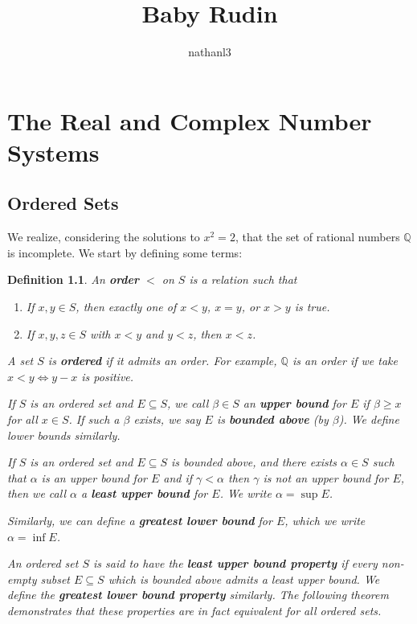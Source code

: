 \documentclass{scrbook}
\title{Baby Rudin}
\author{nathanl3}
\newcommand{\Q}{\mathbb{Q}}
\newtheorem{definition}{Definition}
\begin{document}
\maketitle

\tableofcontents

%

\chapter{The Real and Complex Number Systems}

\section{Ordered Sets}
We realize, considering the solutions to $x^2 = 2$, that the set of rational numbers $\Q$ is incomplete. We start by defining some terms:
\begin{definition}
An \textbf{order} $<$ on $S$ is a relation such that 
\begin{enumerate}
\item If $x, y \in S$, then exactly one of $x < y$, $x = y$, or $x > y$ is true.
\item If $x, y, z \in S$ with $x < y$ and $y < z$, then $x < z$. 
\end{enumerate}

A set $S$ is \textbf{ordered} if it admits an order. For example, $\Q$ is an order if we take $x < y \iff y - x$ is positive. 

If $S$ is an ordered set and $E \subseteq S$, we call $\beta \in S$ an \textbf{upper bound} for $E$ if $\beta \ge x$ for all $x \in S$. If such a $\beta$ exists, we say $E$ is \textbf{bounded above} (by $\beta$). We define lower bounds similarly. 

If $S$ is an ordered set and $E \subseteq S$ is bounded above, and there exists $\alpha \in S$ such that $\alpha$ is an upper bound for $E$ and if $\gamma < \alpha$ then $\gamma$ is not an upper bound for $E$, then we call $\alpha$ a \textbf{least upper bound} for $E$. We write $\alpha = \sup E$.

Similarly, we can define a \textbf{greatest lower bound} for $E$, which we write $\alpha = \inf E$. 

An ordered set $S$ is said to have the \textbf{least upper bound property} if every non-empty subset $E \subseteq S$ which is bounded above admits a least upper bound. We define the \textbf{greatest lower bound property} similarly. The following theorem demonstrates that these properties are in fact equivalent for all ordered sets.
\end{definition}
\end{document}
